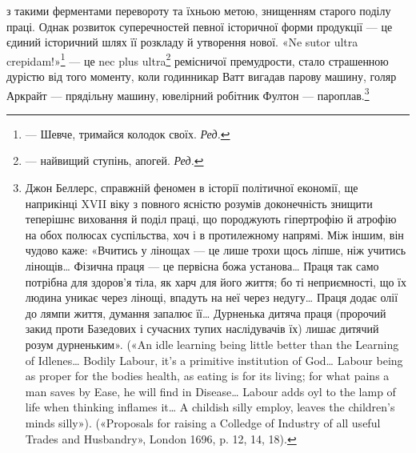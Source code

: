\parcont{}  %
з такими ферментами перевороту та їхньою метою, знищенням
старого поділу праці. Однак розвиток суперечностей певної історичної
форми продукції — це єдиний історичний шлях її розкладу
й утворення нової. «Ne sutor ultra crepidam!»\footnote*{
— Шевче, тримайся колодок своїх. \emph{Ред.}
} — це nec plus ultra\footnote*{
— найвищий ступінь, апогей. \emph{Ред.}
} ремісничої премудрости, стало страшенною дурістю від
того моменту, коли годинникар Ватт вигадав парову машину,
голяр Аркрайт — прядільну машину, ювелірний робітник Фултон
— пароплав.\footnote{
Джон Беллерс, справжній феномен в історії політичної економії,
ще наприкінці XVII віку з повного ясністю розумів доконечність знищити
теперішнє виховання й поділ праці, що породжують гіпертрофію й атрофію
на обох полюсах суспільства, хоч і в протилежному напрямі. Між
іншим, він чудово каже: «Вчитись у лінощах — це лише трохи щось ліпше,
ніж учитись лінощів\dots{} Фізична праця — це первісна божа установа\dots{}
Праця так само потрібна для здоров’я тіла, як харч для його життя;
бо ті неприємності, що їх людина уникає через лінощі, впадуть на неї
через недугу\dots{} Праця додає олії до лямпи життя, думання запалює її\dots{}
Дурненька дитяча праця (пророчий закид проти Базедових і сучасних
тупих наслідувачів їх) лишає дитячий розум дурненьким». («An idle
learning being little better than the Learning of Idlenes\dots{} Bodily Labour,
it’s a primitive institution of God\dots{} Labour being as proper for the
bodies health, as eating is for its living; for what pains a man saves by
Ease, he will find in Disease\dots{} Labour adds oyl to the lamp of life when
thinking inflames it\dots{} A childish silly employ, leaves the children’s minds
silly»). («Proposals for raising a Colledge of Industry of all useful Trades
and Husbandry», London 1696, p. 12, 14, 18).
}

